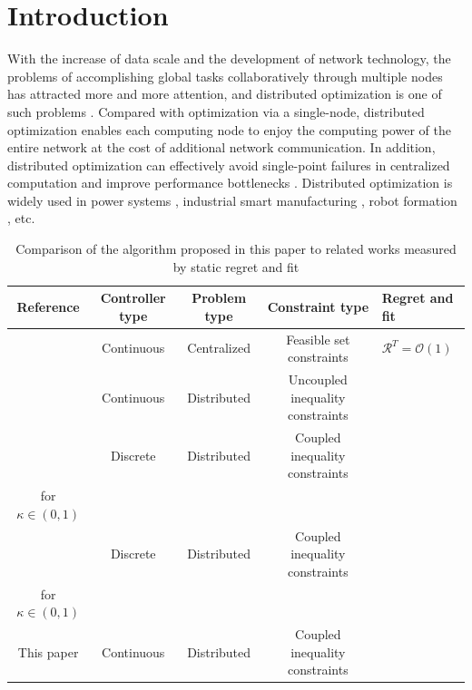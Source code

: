 \documentclass[final,5p,times,twocolumn,authoryear]{elsarticle}
\begin{document}
\section{Introduction}\label{int}
	With the increase of data scale and the development of network technology, the problems of accomplishing global tasks collaboratively through multiple nodes has attracted more and more attention, and distributed optimization is one of such problems \citep{nedic2018,yang2019}. Compared with optimization via a single-node, distributed optimization enables each computing node to enjoy the computing power of the entire network at the cost of additional network communication. In addition, distributed optimization can effectively avoid single-point failures in centralized computation and improve performance bottlenecks \citep{chen2012}. Distributed optimization is widely used in power systems \citep{anoh2020}, industrial smart manufacturing \citep{mao2022}, robot formation \citep{sun2022}, etc.
	
	\begin{table}
		\small
		\caption{Comparison of the algorithm proposed in this paper to related works measured by static regret and fit}
		\label{tab_1}
			\begin{tabular*}{\linewidth}{@{}c|c|c|c|l@{}}
				\hline
				Reference & Controller type & Problem type & Constraint type & Regret and fit\\
				\hline
				\citet{pater2017} & Continuous & Centralized & Feasible set constraints & $\mathcal{R}^T=\mathcal{O}(1)$\\
				\hline
				\citet{pater2020} & Continuous & Distributed & Uncoupled inequality constraints &\makecell[l]{$\mathcal{R}^T=\mathcal{O}(\sqrt{T})$,$\mathcal{F}^T=\mathcal{O}(\sqrt{T})$} \\
				\hline
				\citet{yi2020} & Discrete & Distributed & Coupled inequality constraints & \makecell[l]{$\mathcal{R}^T=\mathcal{O}(T^{\max\{\kappa,1-\kappa\}})$, $\mathcal{F}^T = \mathcal{O}(T^{\max\{\kappa,1-\kappa\}})$\\ for $\kappa\in(0,1)$}\\
				\hline
				\citet{li2022} & Discrete & Distributed & Coupled inequality constraints & \makecell[l]{$\mathcal{R}^T= \mathcal{O}(T^{\max\{\kappa,1-\kappa\}})$, $\mathcal{F}^T = \mathcal{O}(T^{\max\{\frac{1}{2}+\frac{\kappa}{2},1-\frac{\kappa}{2}\}})$\\ for $\kappa\in(0,1)$} \\
				\hline
				This paper & Continuous &Distributed & Coupled inequality constraints &\makecell[l]{ $\mathcal{R}^T=\mathcal{O}(1)$,$\mathcal{F}^T=\mathcal{O}(\sqrt{T})$}\\
				\hline
			\end{tabular*}
	\end{table}
	
\end{document}
